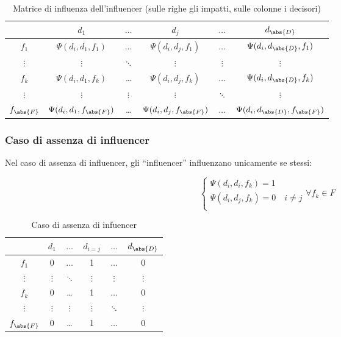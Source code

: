 \documentclass[\main/main.tex]{subfiles}
\begin{document}
\begin{table}
	\begin{tabular}{|c|c|c|c|c|c|}
		\hline
		              & $d_1$                         & $\ldots$ & $d_j$                         & $\ldots$ & $d_{\abs{D}}$                         \\
		\hline
		$f_1$         & $\Psi(d_i, d_1, f_1)$         & $\ldots$ & $\Psi(d_i, d_j, f_1)$         & $\ldots$ & $\Psi(d_i, d_{\abs{D}}, f_1)$         \\
		\hline
		$\vdots$      & $\vdots$                      & $\ddots$ & $\vdots$                      & $\vdots$ & $\vdots$                              \\
		\hline
		$f_k$         & $\Psi(d_i, d_1, f_k)$         & \ldots   & $\Psi(d_i, d_j, f_k)$         & $\ldots$ & $\Psi(d_i, d_{\abs{D}}, f_k)$         \\
		\hline
		$\vdots$      & $\vdots$                      & $\vdots$ & $\vdots$                      & $\ddots$ & $\vdots$                              \\
		\hline
		$f_{\abs{F}}$ & $\Psi(d_i, d_1, f_{\abs{F}})$ & \ldots   & $\Psi(d_i, d_j, f_{\abs{F}})$ & $\ldots$ & $\Psi(d_i, d_{\abs{D}}, f_{\abs{F}})$ \\
		\hline
	\end{tabular}
	\caption{Matrice di influenza dell'influencer (sulle righe gli impatti, sulle colonne i decisori)}
\end{table}

\subsubsection{Caso di assenza di influencer}
Nel caso di assenza di influencer, gli ``influencer'' influenzano unicamente se stessi:

\[
	\begin{cases}
		\Psi(d_i, d_i, f_k) = 1                \\
		\Psi(d_i, d_j, f_k) = 0 \quad i \neq j \\
	\end{cases}
	\forall f_k \in F
\]

\begin{table}
	\begin{tabular}{|c|c|c|c|c|c|}
		\hline
		              & $d_1$    & $\ldots$ & $d_{i=j}$ & $\ldots$ & $d_{\abs{D}}$ \\
		\hline
		$f_1$         & 0        & $\ldots$ & 1         & $\ldots$ & 0             \\
		\hline
		$\vdots$      & $\vdots$ & $\ddots$ & $\vdots$  & $\vdots$ & $\vdots$      \\
		\hline
		$f_k$         & 0        & \ldots   & 1         & $\ldots$ & 0             \\
		\hline
		$\vdots$      & $\vdots$ & $\vdots$ & $\vdots$  & $\ddots$ & $\vdots$      \\
		\hline
		$f_{\abs{F}}$ & 0        & \ldots   & 1         & $\ldots$ & 0             \\
		\hline
	\end{tabular}
	\caption{Caso di assenza di infuencer}
\end{table}
\end{document}
